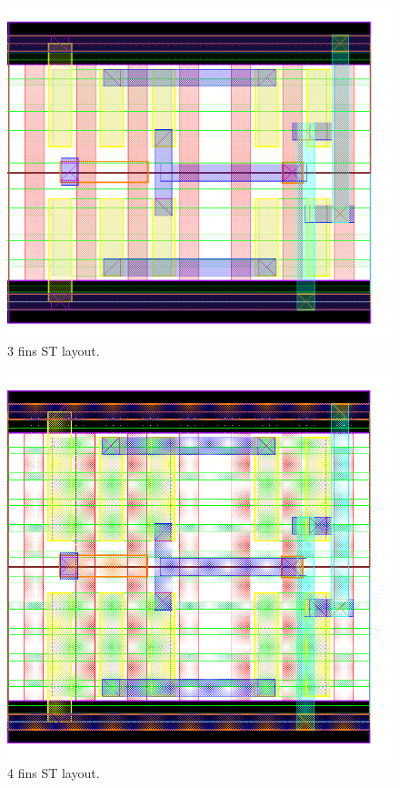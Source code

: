 \documentclass[pgmicro,mestrado,english]{iiufrgs}
\begin{document}
\begin{figure}[H]
\centering
\includegraphics[width=\textwidth,height=\textheight,keepaspectratio]{ST3F.png}
\caption{3 fins ST layout.}
\label{fig:ST3F}
\end{figure}

\begin{figure}[H]
\centering
\includegraphics[width=\textwidth,height=\textheight,keepaspectratio]{ST4F.png}
\caption{4 fins ST layout.}
\label{fig:ST4F}
\end{figure}
\end{document}

